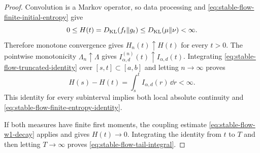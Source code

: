\begin{proof}
Convolution is a Markov operator, so data processing and
\eqref{eq:stable-flow-finite-initial-entropy} give
\[
 0\le H(t)=D_{\rm KL}(f_t\|g_t)\le D_{\rm KL}(\mu\|\nu)<\infty .
\]
Therefore monotone convergence gives \(H_n(t)\uparrow H(t)\) for every
\(t>0\).  The pointwise monotonicity \(\Lambda_n\uparrow\Lambda\) gives
\(I_{\alpha,d}^{(n)}(t)\uparrow I_{\alpha,d}(t)\).  Integrating
\eqref{eq:stable-flow-truncated-identity} over \([s,t]\subset[a,b]\) and
letting \(n\to\infty\) proves
\[
 H(s)-H(t)=\int_s^t I_{\alpha,d}(r)\,\dd r<\infty .
\]
This identity for every subinterval implies both local absolute continuity and
\eqref{eq:stable-flow-finite-entropy-identity}.

If both measures have finite first moments, the coupling estimate
\eqref{eq:stable-flow-w1-decay} applies and gives \(H(t)\to0\).  Integrating
the identity from \(t\) to \(T\) and then letting \(T\to\infty\) proves
\eqref{eq:stable-flow-tail-integral}.
\end{proof}

